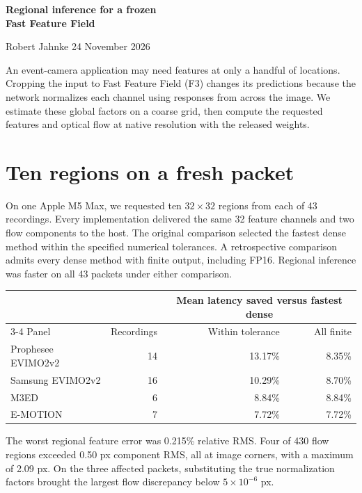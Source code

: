\documentclass[11pt,letterpaper]{article}
\begin{document}
{\fontsize{22}{25}\selectfont\bfseries\color{ink}Regional inference for a frozen\\Fast Feature Field\par}
{\small\color{muted}Robert Jahnke \hfill 24 November 2026}\par
\vspace{.15em}{\color{ink}\hrule}\vspace{.35em}
An event-camera application may need features at only a handful of locations. Cropping the input to Fast Feature Field (F3) changes its predictions because the network normalizes each channel using responses from across the image. We estimate these global factors on a coarse grid, then compute the requested features and optical flow at native resolution with the released weights.

\section*{Ten regions on a fresh packet}
On one Apple M5 Max, we requested ten $32\times32$ regions from each of 43 recordings. Every implementation delivered the same 32 feature channels and two flow components to the host. The original comparison selected the fastest dense method within the specified numerical tolerances. A retrospective comparison admits every dense method with finite output, including FP16. Regional inference was faster on all 43 packets under either comparison.

\begin{center}
\small\begin{tabular}{@{}lrrr@{}}
\toprule
& & \multicolumn{2}{c}{Mean latency saved versus fastest dense}\\
\cmidrule(l){3-4}
Panel & Recordings & Within tolerance & All finite\\
\midrule
Prophesee EVIMO2v2 & 14 & 13.17\% & 8.35\%\\
Samsung EVIMO2v2 & 16 & 10.29\% & 8.70\%\\
M3ED & 6 & 8.84\% & 8.84\%\\
E-MOTION & 7 & 7.72\% & 7.72\%\\
\bottomrule\end{tabular}
\end{center}

The worst regional feature error was 0.215\% relative RMS. Four of 430 flow regions exceeded 0.50 px component RMS, all at image corners, with a maximum of 2.09 px. On the three affected packets, substituting the true normalization factors brought the largest flow discrepancy below $5\times10^{-6}$ px.
\end{document}
